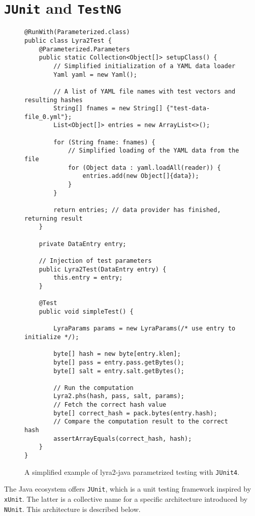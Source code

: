 \section{\texttt{JUnit} and \texttt{TestNG}}
\label{sec:unit-junit-testng}

\begin{figure}
\small
\begin{verbatim}
@RunWith(Parameterized.class)
public class Lyra2Test {
    @Parameterized.Parameters
    public static Collection<Object[]> setupClass() {
        // Simplified initialization of a YAML data loader
        Yaml yaml = new Yaml();

        // A list of YAML file names with test vectors and resulting hashes
        String[] fnames = new String[] {"test-data-file_0.yml"};
        List<Object[]> entries = new ArrayList<>();

        for (String fname: fnames) {
            // Simplified loading of the YAML data from the file
            for (Object data : yaml.loadAll(reader)) {
                entries.add(new Object[]{data});
            }
        }

        return entries; // data provider has finished, returning result
    }

    private DataEntry entry;

    // Injection of test parameters
    public Lyra2Test(DataEntry entry) {
        this.entry = entry;
    }

    @Test
    public void simpleTest() {

        LyraParams params = new LyraParams(/* use entry to initialize */);

        byte[] hash = new byte[entry.klen];
        byte[] pass = entry.pass.getBytes();
        byte[] salt = entry.salt.getBytes();

        // Run the computation
        Lyra2.phs(hash, pass, salt, params);
        // Fetch the correct hash value
        byte[] correct_hash = pack.bytes(entry.hash);
        // Compare the computation result to the correct hash
        assertArrayEquals(correct_hash, hash);
    }
}
\end{verbatim}
\normalsize
\caption{A simplified example of lyra2-java parametrized testing with \texttt{JUnit4}.}
\label{fig:junit4-parametrization}
\end{figure}

The Java ecosystem offers \texttt{JUnit}, which is a unit testing framework inspired by \texttt{xUnit}. The latter is a collective name for a specific architecture introduced by \texttt{NUnit}. This architecture is described below.

